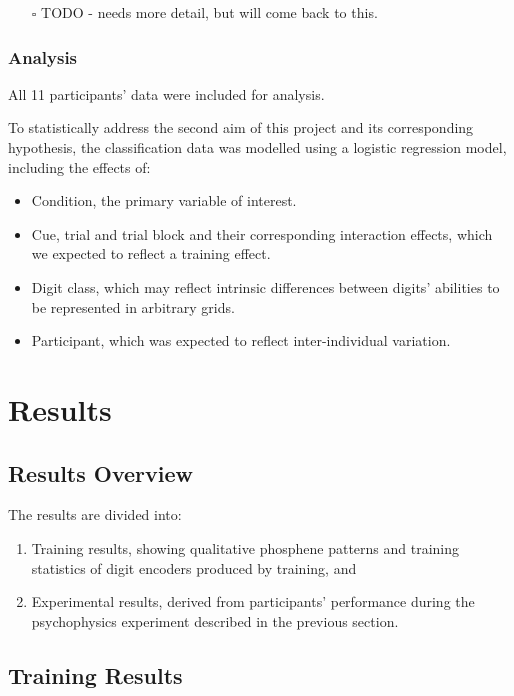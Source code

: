 \documentclass[a4paper,11pt,openany]{book}
\begin{document}
\begin{itemize}
\item[{$\square$}] TODO - needs more detail, but will come back to this.
\end{itemize}

\section*{Analysis}
\label{sec:orgc26c1a2}

All 11 participants' data were included for analysis.

To statistically address the second aim of this project and its corresponding hypothesis, the classification data was modelled using a logistic regression model, including the effects of:
\begin{itemize}
\item Condition, the primary variable of interest.
\item Cue, trial and trial block and their corresponding interaction effects, which we expected to reflect a training effect.
\item Digit class, which may reflect intrinsic differences between digits' abilities to be represented in arbitrary grids.
\item Participant, which was expected to reflect inter-individual variation.
\end{itemize}

\part{Results}
\label{sec:orgd1cb1c9}

\chapter*{Results Overview}
\label{sec:org8c640af}
The results are divided into:

\begin{enumerate}
\item Training results, showing qualitative phosphene patterns and training statistics of digit encoders produced by training, and
\item Experimental results, derived from participants' performance during the psychophysics experiment described in the previous section.
\end{enumerate}

\chapter{Training Results}
\label{sec:orga15b6d9}
\end{document}
